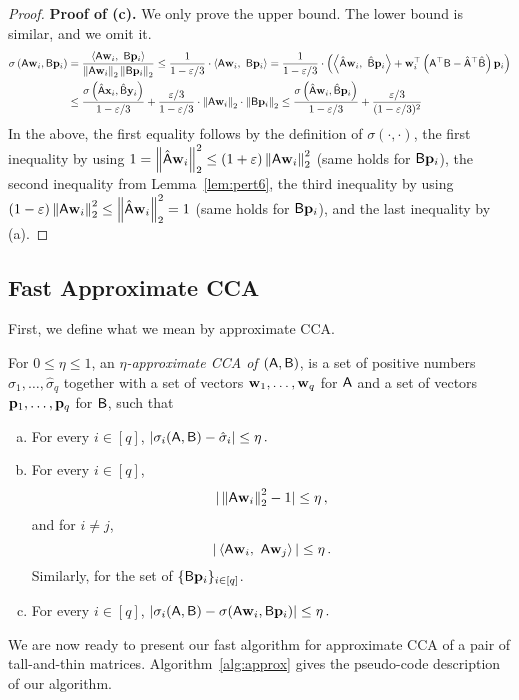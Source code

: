 \begin{proof}
{\bf Proof of (c).} We only prove the upper bound. The lower bound is similar, and we omit it.\\
\small
\begin{align*}
\sigma\left({\mathsf{A} } {\mathbf{w}}_i, {\mathsf{B} } {\mathbf p}_i\right)	 & =  \frac{\left\langle { {\ensuremath{\mathsf{A} }}{\mathbf{w}}_i},\ {{\mathsf{B} }{\mathbf p}_i} \right\rangle}{\left\|{\mathsf{A} }{\mathbf{w}}_i\right\|_2\left\|{\mathsf{B} }{\mathbf p}_i\right\|_2}
					 						 \leq \frac{1}{1-\varepsilon/3}\cdot\left\langle { {\ensuremath{\mathsf{A} }}{\mathbf{w}}_i},\ {{\mathsf{B} }{\mathbf p}_i} \right\rangle
                                               =   \frac{1}{1-\varepsilon/3}\cdot \left( \left\langle {\hat{ {\ensuremath{\mathsf{A} }}}{\mathbf{w}}_i},\ {\hat{{\mathsf{B} }}{\mathbf p}_i} \right\rangle
                                                 +  {\mathbf{w}}^\top_i\left({\mathsf{A} }^\top{\ensuremath{\mathsf{B} }} - \hat{{\mathsf{A} }}^\top\hat{{\mathsf{B} }} \right){\mathbf p}_i \right) \\
                                              &   \leq   \frac{\sigma\left(\hat{{\mathsf{A} }} \mathbf{x}_i, \hat{{\mathsf{B} }}\mathbf{y}_i\right)}{1-\varepsilon/3}
                                                 +   \frac{\varepsilon/3}{1-\varepsilon/3}\cdot\left\|{\mathsf{A} }{\mathbf{w}}_i\right\|_2\cdot\left\|{\mathsf{B} }{\mathbf p}_i\right\|_2
											     \leq   \frac{\sigma\left(\hat{{\mathsf{A} }} {\mathbf{w}}_i, \hat{{\mathsf{B} }}{\mathbf p}_i\right)}{1-\varepsilon/3} + \frac{\varepsilon/3}{(1-\varepsilon/3)^2}
\end{align*}
In the above,
the first equality follows by the definition of $\sigma(\cdot,\cdot)$,
the first inequality by using $1=\left\|\hat{{\mathsf{A} }}{\mathbf{w}}_i\right\|_2^2 \leq (1+\varepsilon) \left\|{\mathsf{A} }{\mathbf{w}}_i\right\|_2^2$ (same holds for ${\mathsf{B} }{\mathbf p}_i$),
the second inequality from Lemma~\ref{lem:pert6},
the third inequality  by using $(1-\varepsilon)\left\|{\mathsf{A} }{\mathbf{w}}_i\right\|_2^2\leq \left\|\hat{{\mathsf{A} }} {\mathbf{w}}_i\right\|_2^2 =1$ (same holds for ${\mathsf{B} }{\mathbf p}_i$),
and the last inequality by (a).
\end{proof}





\subsection{Fast Approximate CCA}\label{sec:alg}

First, we define what we mean by approximate CCA.
\begin{definition} \label{def:approxCCA}
For $0 \leq \eta \leq 1$, an {\em $\eta$-approximate CCA of $({\mathsf{A} }, {\mathsf{B} })$}, is a set of positive numbers $\hat{\sigma}_1,\dots,\hat{\sigma}_q$ together with a set of vectors ${\mathbf{w}}_1,\dots,{\mathbf{w}}_q$ for ${\mathsf{A} }$ and a set of vectors ${\mathbf p}_1,\dots,{\mathbf p}_q$ for ${\mathsf{B} }$, such that
\begin{enumerate}[(a)]
\item For every $i\in[q]$, $|\sigma_i({\mathsf{A} }, {\mathsf{B} }) - \hat{\sigma}_i | \leq \eta\,.$
\item For every $i\in[q]$, \[|\left\|{\mathsf{A} } {\mathbf{w}}_i\right\|_2^2 - 1 | \leq \eta\,,\] and for $i\neq j$, \[|\left\langle { {\ensuremath{\mathsf{A} }}{\mathbf{w}}_i},\ { {\mathsf{A} } {\mathbf{w}}_j} \right\rangle| \leq \eta\,.\] Similarly, for the set of $\{{\mathsf{B} } {\mathbf p}_i\}_{i\in{[q]}}$.
\item For every $i\in[q]$, $|\sigma_i({\mathsf{A} }, {\mathsf{B} }) - \sigma({\mathsf{A} } {\mathbf{w}}_i, {\mathsf{B} } {\mathbf p}_i) | \leq \eta\,.$
\end{enumerate}
\end{definition}
We are now ready to present our fast algorithm for approximate CCA of a pair of tall-and-thin matrices. Algorithm~\ref{alg:approx} gives the pseudo-code description of our algorithm.

